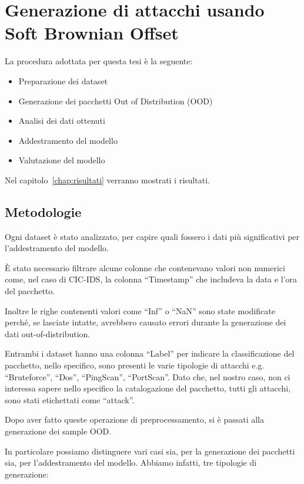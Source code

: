 \chapter{Generazione di attacchi usando Soft Brownian Offset}
\label{chap:generazione_di_attacchi_usando_sbo}

La procedura adottata per questa tesi è la seguente:

\begin{itemize}
    \item Preparazione dei dataset
    \item Generazione dei pacchetti Out of Distribution (OOD)
    \item Analisi dei dati ottenuti
    \item Addestramento del modello
    \item Valutazione del modello
\end{itemize}



Nel capitolo~\ref{chap:risultati} verranno mostrati i risultati.


\section{Metodologie}

Ogni dataset è stato analizzato, per capire quali fossero i dati più significativi per l'addestramento del modello. 

È stato necessario filtrare alcune colonne che contenevano valori non numerici come, nel caso di CIC-IDS, la colonna ``Timestamp'' che includeva la data e l'ora del pacchetto.

Inoltre le righe contenenti valori come ``Inf'' o ``NaN'' sono state modificate perché, se lasciate intatte, avrebbero causato errori durante la generazione dei dati out-of-distribution.

Entrambi i dataset hanno una colonna ``Label'' per indicare la classificazione del pacchetto, nello specifico, sono presenti le varie tipologie di attacchi e.g. ``Bruteforce'', ``Dos'', ``PingScan'', ``PortScan''. Dato che, nel nostro caso, non ci interessa sapere nello specifico la catalogazione del pacchetto, tutti gli attacchi, sono stati etichettati come ``attack''.

Dopo aver fatto queste operazione di preprocessamento, si è passati alla generazione dei sample OOD.

In particolare possiamo distinguere vari casi sia, per la generazione dei pacchetti sia, per l'addestramento del modello. Abbiamo infatti, tre tipologie di generazione:

